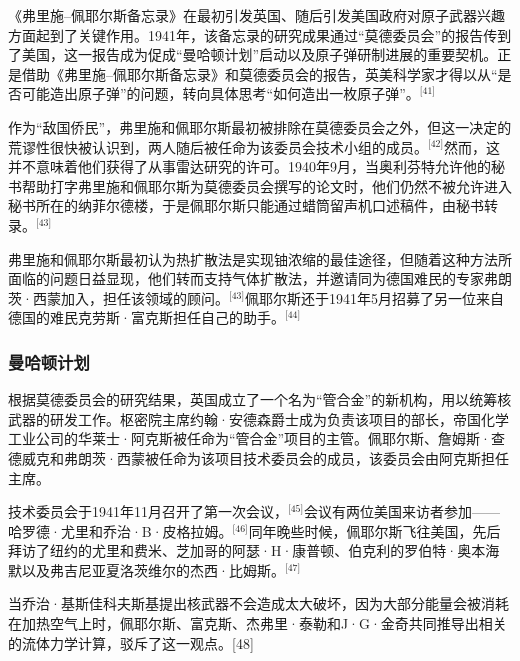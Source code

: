 《弗里施–佩耶尔斯备忘录》在最初引发英国、随后引发美国政府对原子武器兴趣方面起到了关键作用。1941年，该备忘录的研究成果通过“莫德委员会”的报告传到了美国，这一报告成为促成“曼哈顿计划”启动以及原子弹研制进展的重要契机。正是借助《弗里施–佩耶尔斯备忘录》和莫德委员会的报告，英美科学家才得以从“是否可能造出原子弹”的问题，转向具体思考“如何造出一枚原子弹”。\(^\text{[41]}\)

作为“敌国侨民”，弗里施和佩耶尔斯最初被排除在莫德委员会之外，但这一决定的荒谬性很快被认识到，两人随后被任命为该委员会技术小组的成员。\(^\text{[42]}\)然而，这并不意味着他们获得了从事雷达研究的许可。1940年9月，当奥利芬特允许他的秘书帮助打字弗里施和佩耶尔斯为莫德委员会撰写的论文时，他们仍然不被允许进入秘书所在的纳菲尔德楼，于是佩耶尔斯只能通过蜡筒留声机口述稿件，由秘书转录。\(^\text{[43]}\)

弗里施和佩耶尔斯最初认为热扩散法是实现铀浓缩的最佳途径，但随着这种方法所面临的问题日益显现，他们转而支持气体扩散法，并邀请同为德国难民的专家弗朗茨·西蒙加入，担任该领域的顾问。\(^\text{[43]}\)佩耶尔斯还于1941年5月招募了另一位来自德国的难民克劳斯·富克斯担任自己的助手。\(^\text{[44]}\)
\subsubsection{曼哈顿计划}
根据莫德委员会的研究结果，英国成立了一个名为“管合金”的新机构，用以统筹核武器的研发工作。枢密院主席约翰·安德森爵士成为负责该项目的部长，帝国化学工业公司的华莱士·阿克斯被任命为“管合金”项目的主管。佩耶尔斯、詹姆斯·查德威克和弗朗茨·西蒙被任命为该项目技术委员会的成员，该委员会由阿克斯担任主席。

技术委员会于1941年11月召开了第一次会议，\(^\text{[45]}\)会议有两位美国来访者参加——哈罗德·尤里和乔治·B·皮格拉姆。\(^\text{[46]}\)同年晚些时候，佩耶尔斯飞往美国，先后拜访了纽约的尤里和费米、芝加哥的阿瑟·H·康普顿、伯克利的罗伯特·奥本海默以及弗吉尼亚夏洛茨维尔的杰西·比姆斯。\(^\text{[47]}\)

当乔治·基斯佳科夫斯基提出核武器不会造成太大破坏，因为大部分能量会被消耗在加热空气上时，佩耶尔斯、富克斯、杰弗里·泰勒和J·G·金奇共同推导出相关的流体力学计算，驳斥了这一观点。[48]
